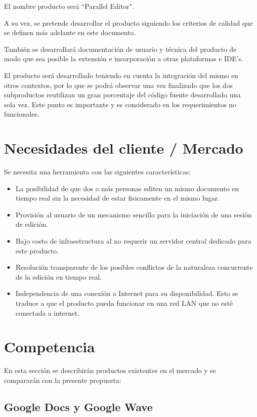 \documentclass[12pt,a4paper]{article}
\begin{document}
El nombre producto será ``Parallel Editor".

A su vez, se pretende desarrollar el producto siguiendo los criterios de calidad que se definen más adelante en este documento.

También se desarrollará documentación de usuario y técnica del producto de modo que sea posible la extensión e incorporación a otras plataformas e IDE's.

El producto será desarrollado teniendo en cuenta la integración del mismo en otros contextos, por lo que se podrá observar una vez finalizado que los dos subproductos reutilizan un gran porcentaje del código fuente desarrollado una sola vez. Este punto es importante y es considerado en los requerimientos no funcionales.	
	
	\section{Necesidades del cliente / Mercado}
	
	Se necesita una herramienta con las siguientes características:
	\begin{itemize}
		\item La posibilidad de que dos o más personas editen un mismo documento en tiempo real sin la necesidad de estar fisicamente en el mismo lugar.
		\item Provisión al usuario de un mecanismo sencillo para la iniciación de una sesión de edición.
		\item Bajo costo de infraestructura al no requerir un servidor central dedicado para este producto.
		\item Resolución transparente de los posibles conflictos de la naturaleza concurrente de la edición en tiempo real.
		\item Independencia de una conexión a Internet para su disponibilidad. Esto se traduce a que el producto pueda funcionar en una red LAN que no esté conectada a internet.
	\end{itemize}

	\section{Competencia}

En esta sección se describirán productos existentes en el mercado y se compararán con la presente propuesta:

	\subsection{Google Docs \cite{googledocs} y Google Wave \cite{googlewave}}
\end{document}
